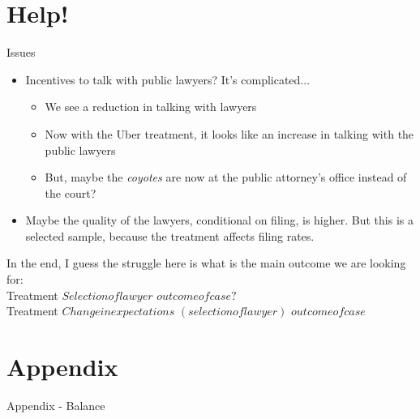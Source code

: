 \documentclass[8pt]{beamer}
\begin{document}
\section{Help!}
\begin{frame}{Issues}
    \begin{itemize}
        \item Incentives to talk with public lawyers? It's complicated...
        \pause
    \begin{itemize}
        \item We see a reduction in talking with lawyers
        \item Now with the Uber treatment, it looks like an increase in talking with the public lawyers
        \item But, maybe the \textit{coyotes} are now at the public attorney's office instead of the court?
        \end{itemize}
        \pause
    \item Maybe the quality of the lawyers, conditional on filing, is higher. But this is a selected sample, because the treatment affects filing rates.     \end{itemize}
    In the end, I guess the struggle here is what is the main outcome we are looking for: \\
    \vspace{.1in}
   Treatment \xrightarrow{} $Selection of lawyer$ \xrightarrow{} $outcome of case?$  \\
 
 \vspace{.1in}
    Treatment \xrightarrow{} $Change in expectations$ \xrightarrow{} $(selection of lawyer)$ \xrightarrow{} $outcome of case$
\end{frame}




\section{Appendix}

\begin{frame}{Appendix - Balance}
\begin{table}[H] 
 \begin{subtable}{1.\textwidth}
 \begin{center}
 \tiny{}
 \end{center}
 \end{subtable}
 \end{table}  
\end{frame}
\end{document}
